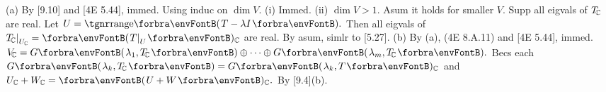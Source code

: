 (a) By [9.10] and [4E 5.44], immed. \;\Or Using induc on $\dim V.$ (i) Immed. (ii) $\dim V>1.$\parSol{\Ha}
Asum it holds for smaller $V.$ Supp all eigvals of $T_{\!{\mathbb{C}}}$ are real. Let $U=\Range\Par{T-\lambda I}.$\parSol{\Ha}
Then all eigvals of $ T_{\!\Cbb}\mmid_{U_{\Cbb}}=\Par{T\mmid_U}{_{\Cbb}}$ are real. By asum, simlr to [5.27].\vspace{3pt}\parSol{}
(b) By (a), (4E 8.A.11) and [4E 5.44], immed. \Or $V_{\!\Cbb}=G\Par{\lambda_1,T_{\!\Cbb}}\oplus\cdots\oplus G\Par{\lambda_m,T_{\!\Cbb}}.$\parSol{\Hb}
Becs each $G\Par{\lambda_k,T_{\!\Cbb}}=G\Par{\lambda_k,T}{_{\Cbb}}$ and $U_{\Cbb}+W_{\Cbb}=\Par{U+W}{_{\Cbb}}.$ \;By [9.4](b).\PfEnd
\SepLine

\ChEnd